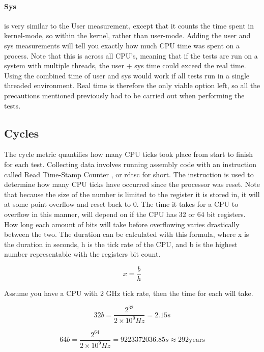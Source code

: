 \paragraph{Sys}is very similar to the User measurement, except that it counts the time spent in kernel-mode, so within the kernel, rather than user-mode.
Adding the user and sys measurements will tell you exactly how much CPU time was spent on a process.
Note that this is across all CPU's, meaning that if the tests are run on a system with multiple threads, the user + sys time could exceed the real time.
Using the combined time of user and sys would work if all tests run in a single threaded environment.
Real time is therefore the only viable option left, so all the precautions mentioned previously had to be carried out when performing the tests.

\subsection{Cycles}
The cycle metric quantifies how many CPU ticks took place from start to finish for each test.
Collecting data involves running assembly code with an instruction called Read Time-Stamp Counter 
, or rdtsc for short.
The instruction is used to determine how many CPU ticks have occurred since the processor was reset.
Note that because the size of the number is limited to the register it is stored in, it will at some point overflow and reset back to 0.
The time it takes for a CPU to overflow in this manner, will depend on if the CPU has 32 or 64 bit registers.
How long each amount of bits will take before overflowing varies drastically between the two.
The duration can be calculated with this formula, where x is the duration in seconds, h is the tick rate of the CPU, and b is the highest number representable with the registers bit count.

\begin{equation}
x = \frac{b}{h}
\end{equation}

\bigskip

Assume you have a CPU with 2 GHz tick rate, then the time for each will take.

\begin{equation}
32b = \frac{2^{32}}{2 \times 10^{9}Hz} = 2.15s
\end{equation}

\begin{equation}
64b = \frac{2^{64}}{2 \times 10^{9}Hz} = 9223372036.85s \approx 292 \text{years}
\end{equation}

